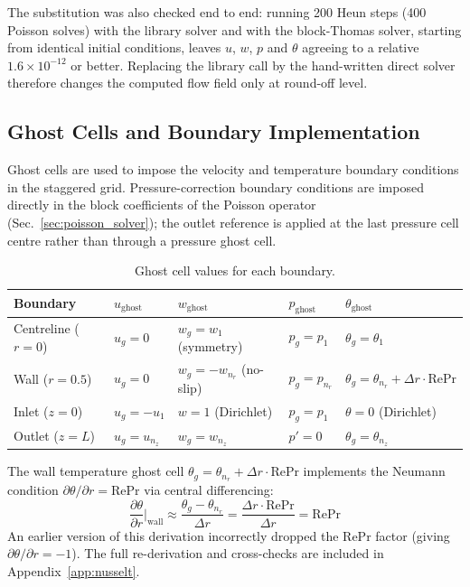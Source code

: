 \documentclass[12pt,a4paper]{article}
\newcommand{\parder}[2]{\frac{\partial #1}{\partial #2}}
\newcommand{\Rey}{\text{Re}}
\newcommand{\Pran}{\text{Pr}}
\begin{document}
The substitution was also checked end to end: running 200 Heun steps (400 Poisson solves) with the library solver and with the block-Thomas solver, starting from identical initial conditions, leaves $u$, $w$, $p$ and $\theta$ agreeing to a relative $1.6\times10^{-12}$ or better.
Replacing the library call by the hand-written direct solver therefore changes the computed flow field only at round-off level.

\subsection{Ghost Cells and Boundary Implementation}

Ghost cells are used to impose the velocity and temperature boundary conditions in the staggered grid.
Pressure-correction boundary conditions are imposed directly in the block coefficients of the
Poisson operator (Sec.~\ref{sec:poisson_solver}); the outlet reference is applied at the last
pressure cell centre rather than through a pressure ghost cell.

\begin{table}[H]
\centering
\caption{Ghost cell values for each boundary.}
\label{tab:ghost}
\begin{tabular}{lllll}
\toprule
\textbf{Boundary} & $u_{\text{ghost}}$ & $w_{\text{ghost}}$ & $p_{\text{ghost}}$ & $\theta_{\text{ghost}}$ \\
\midrule
Centreline ($r=0$) & $u_g = 0$ & $w_g = w_1$ (symmetry) & $p_g = p_1$ & $\theta_g = \theta_1$ \\
Wall ($r=0.5$) & $u_g = 0$ & $w_g = -w_{n_r}$ (no-slip) & $p_g = p_{n_r}$ & $\theta_g = \theta_{n_r} + \Delta r\cdot\Rey\Pran$ \\
Inlet ($z=0$) & $u_g = -u_1$ & $w = 1$ (Dirichlet) & $p_g = p_1$ & $\theta = 0$ (Dirichlet) \\
Outlet ($z=L$) & $u_g = u_{n_z}$ & $w_g = w_{n_z}$ & $p' = 0$ & $\theta_g = \theta_{n_z}$ \\
\bottomrule
\end{tabular}
\end{table}

The wall temperature ghost cell $\theta_g = \theta_{n_r} + \Delta r\cdot\Rey\Pran$ implements the Neumann condition $\partial\theta/\partial r = \Rey\Pran$ via central differencing:
\begin{equation}
    \parder{\theta}{r}\bigg|_{\text{wall}} \approx \frac{\theta_g - \theta_{n_r}}{\Delta r} = \frac{\Delta r\cdot\Rey\Pran}{\Delta r} = \Rey\Pran
\end{equation}
An earlier version of this derivation incorrectly dropped the $\Rey\Pran$ factor (giving $\partial\theta/\partial r = -1$). The full re-derivation and cross-checks are included in Appendix~\ref{app:nusselt}.
\end{document}
